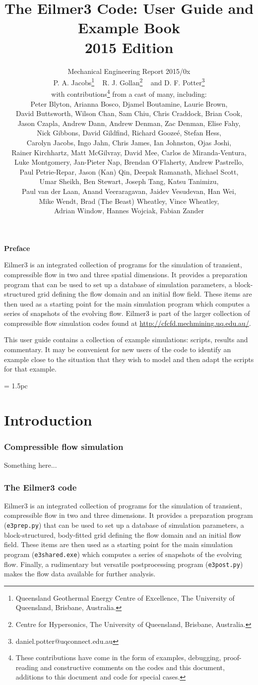 \documentclass[12pt,a4paper,twoside]{article}
\title{
    The Eilmer3 Code: User Guide and Example Book\\
    2015 Edition
}
\author{
    Mechanical Engineering Report 2015/0x\\
    P. A. Jacobs\thanks{Queensland Geothermal Energy Centre of Excellence, The University of Queensland, Brisbane, Australia.} 
    ~ R. J. Gollan\thanks{Centre for Hypersonics, The University of Queensland, Brisbane, Australia.}
    ~ and
    D. F. Potter\thanks{daniel.potter@uqconnect.edu.au}\\
    {\normalsize with contributions\thanks{These contributions have come in the form of examples, debugging, 
    proof-reading and constructive comments on the codes and this document, 
    additions to this document and code for special cases.}
    from a cast of many, including:}\\
    {\normalsize Peter Blyton,}
    {\normalsize Arianna Bosco,}
    {\normalsize Djamel Boutamine,}
    {\normalsize Laurie Brown,} \\
    {\normalsize David Buttsworth,}
    {\normalsize Wilson Chan,} 
    {\normalsize Sam Chiu,}
    {\normalsize Chris Craddock,} 
    {\normalsize Brian Cook,} \\ 
    {\normalsize Jason Czapla,}
    {\normalsize Andrew Dann,}  
    {\normalsize Andrew Denman,}
    {\normalsize Zac Denman,}
    {\normalsize Elise Fahy,} \\
    {\normalsize Nick Gibbons,} 
    {\normalsize David Gildfind,} 
    {\normalsize Richard Gooze\'{e},}
    {\normalsize Stefan Hess,} \\
    {\normalsize Carolyn Jacobs,} 
    {\normalsize Ingo Jahn,} 
    {\normalsize Chris James,}
    {\normalsize Ian Johnston,}
    {\normalsize Ojas Joshi,} \\
    {\normalsize Rainer Kirchhartz,} 
    {\normalsize Matt McGilvray,} 
    {\normalsize David Mee,} 
    {\normalsize Carlos de Miranda-Ventura,} \\
    {\normalsize Luke Montgomery,} 
    {\normalsize Jan-Pieter Nap,} 
    {\normalsize Brendan O'Flaherty,} 
    {\normalsize Andrew Pastrello,} \\
    {\normalsize Paul Petrie-Repar,} 
    {\normalsize Jason (Kan) Qin,} 
    {\normalsize Deepak Ramanath,} 
    {\normalsize Michael Scott,} \\
    {\normalsize Umar Sheikh,} 
    {\normalsize Ben Stewart,} 
    {\normalsize Joseph Tang,} 
    {\normalsize Katsu Tanimizu,} \\
    {\normalsize Paul van der Laan,} 
    {\normalsize Anand Veeraragavan,} 
    {\normalsize Jaidev Vesudevan,} 
    {\normalsize Han Wei,} \\
    {\normalsize Mike Wendt,} 
    {\normalsize Brad (The Beast) Wheatley,} 
    {\normalsize Vince Wheatley,} \\
    {\normalsize Adrian Window,} 
    {\normalsize Hannes Wojciak,}
    {\normalsize Fabian Zander}
}
\begin{document}
\maketitle

\centerline{\textbf{Preface}}
Eilmer3 is an integrated collection of programs for the simulation of transient,
compressible flow in two and three spatial dimensions.
It provides a preparation program that can be used to set up a database of
simulation parameters, a block-structured grid defining the flow domain and an
initial flow field.
These items are then used as a starting point for the main simulation program
which computes a series of snapshots of the evolving flow.
Eilmer3 is part of the larger collection of compressible flow simulation codes
found at \url{http://cfcfd.mechmining.uq.edu.au/}.

\medskip
This user guide contains a collection of example simulations: scripts, results
and commentary.
It may be convenient for new users of the code to identify an example
close to the situation that they wish to model and then adapt the 
scripts for that example.

\cleardoublepage
\tableofcontents

\cleardoublepage
\baselineskip = 1.5pc

\part{Introduction}

\section{Compressible flow simulation}
%
Something here...

\section{The Eilmer3 code}
%
Eilmer3 is an integrated collection of programs for the simulation of transient,
compressible flow in two and three dimensions.
It provides a preparation program (\texttt{e3prep.py}) that can be used to set up a database of
simulation parameters, a block-structured, body-fitted grid defining the flow domain and an
initial flow field.
These items are then used as a starting point for the main simulation program (\texttt{e3shared.exe})
which computes a series of snapshots of the evolving flow.
Finally, a rudimentary but versatile postprocessing program (\texttt{e3post.py}) makes the flow data
available for further analysis.
\end{document}
